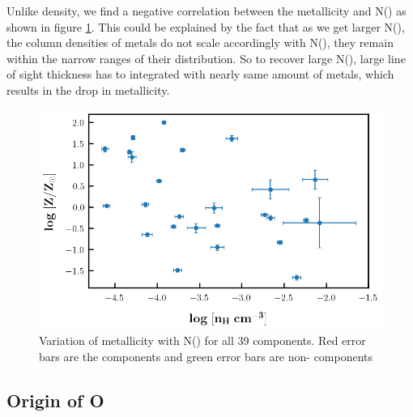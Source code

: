 Unlike density, we find a negative correlation between the metallicity and N() as shown in figure \ref{fig:Z-NHi}. This could be explained by the fact that as we get larger N(), the column densities of metals do not scale accordingly with N(), they remain within the narrow ranges of their distribution. So to recover large N(), large line of sight thickness has to integrated with nearly same amount of metals, which results in the drop in metallicity.


\begin{figure}
    \centering
    \includegraphics[width=\linewidth]{Figures/Z_vs_nH.png}
    \caption{Variation of metallicity with N() for all 39 components. Red error bars are the  components and green error bars are non- components}
    \label{fig:Z-NHi}
\end{figure}


\subsection*{Origin of O \hspace*{-0.5mm}{\footnotesize VI}}

